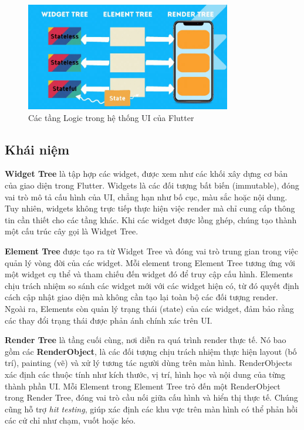 \documentclass[../DoAn.tex]{subfiles}
\numberwithin{figure}{chapter}
\begin{document}
\begin{figure}[H]
    \centering
    \includegraphics[width=0.8\textwidth]{Hinhve/Chuong5/treeflutter.png}
    \caption{Các tầng Logic trong hệ thống UI của Flutter}
    \label{fig:treeflutter}
\end{figure}

\subsection{Khái niệm}

\textbf{Widget Tree} là tập hợp các widget, được xem như các khối xây dựng cơ bản của giao diện trong Flutter. Widgets là các đối tượng bất biến (immutable), đóng vai trò mô tả cấu hình của UI, chẳng hạn như bố cục, màu sắc hoặc nội dung. Tuy nhiên, widgets không trực tiếp thực hiện việc render mà chỉ cung cấp thông tin cần thiết cho các tầng khác. Khi các widget được lồng ghép, chúng tạo thành một cấu trúc cây gọi là Widget Tree.

\textbf{Element Tree} được tạo ra từ Widget Tree và đóng vai trò trung gian trong việc quản lý vòng đời của các widget. Mỗi element trong Element Tree tương ứng với một widget cụ thể và tham chiếu đến widget đó để truy cập cấu hình. Elements chịu trách nhiệm so sánh các widget mới với các widget hiện có, từ đó quyết định cách cập nhật giao diện mà không cần tạo lại toàn bộ các đối tượng render. Ngoài ra, Elements còn quản lý trạng thái (state) của các widget, đảm bảo rằng các thay đổi trạng thái được phản ánh chính xác trên UI.

\textbf{Render Tree} là tầng cuối cùng, nơi diễn ra quá trình render thực tế. Nó bao gồm các \textbf{RenderObject}, là các đối tượng chịu trách nhiệm thực hiện layout (bố trí), painting (vẽ) và xử lý tương tác người dùng trên màn hình. RenderObjects xác định các thuộc tính như kích thước, vị trí, hình học và nội dung của từng thành phần UI. Mỗi Element trong Element Tree trỏ đến một
RenderObject trong Render Tree, đóng vai trò cầu nối giữa cấu hình và hiển thị
thực tế. Chúng cũng hỗ trợ \textit{hit testing}, giúp xác định các khu vực trên màn hình có thể phản hồi các cử chỉ như chạm, vuốt hoặc kéo. 
\end{document}
